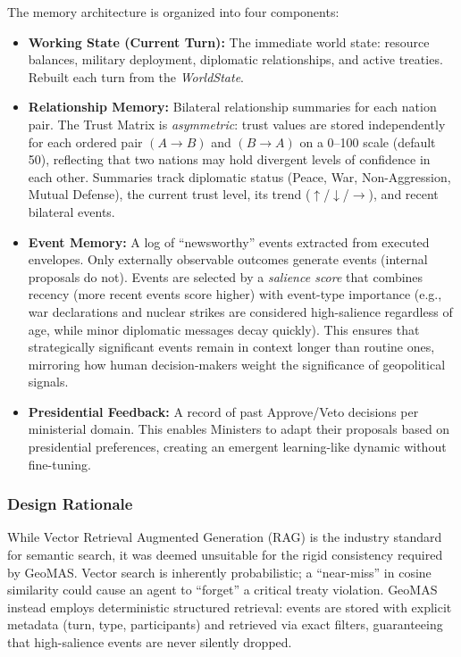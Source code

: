 The memory architecture is organized into four components:
\begin{itemize}
    \item \textbf{Working State (Current Turn):} The immediate world state: resource balances, military deployment, diplomatic relationships, and active treaties. Rebuilt each turn from the \textit{WorldState}.
    \item \textbf{Relationship Memory:} Bilateral relationship summaries for each nation pair. The Trust Matrix is \textit{asymmetric}: trust values are stored independently for each ordered pair $(A \to B)$ and $(B \to A)$ on a 0--100 scale (default 50), reflecting that two nations may hold divergent levels of confidence in each other. Summaries track diplomatic status (Peace, War, Non-Aggression, Mutual Defense), the current trust level, its trend ($\uparrow$/$\downarrow$/$\rightarrow$), and recent bilateral events.
    \item \textbf{Event Memory:} A log of ``newsworthy'' events extracted from executed envelopes. Only externally observable outcomes generate events (internal proposals do not). Events are selected by a \textit{salience score} that combines recency (more recent events score higher) with event-type importance (e.g., war declarations and nuclear strikes are considered high-salience regardless of age, while minor diplomatic messages decay quickly). This ensures that strategically significant events remain in context longer than routine ones, mirroring how human decision-makers weight the significance of geopolitical signals.
    \item \textbf{Presidential Feedback:} A record of past Approve/Veto decisions per ministerial domain. This enables Ministers to adapt their proposals based on presidential preferences, creating an emergent learning-like dynamic without fine-tuning.
\end{itemize}

\subsubsection{Design Rationale} While Vector Retrieval Augmented Generation (RAG) is the industry standard for semantic search, it was deemed unsuitable for the rigid consistency required by GeoMAS. Vector search is inherently probabilistic; a ``near-miss'' in cosine similarity could cause an agent to ``forget'' a critical treaty violation. GeoMAS instead employs deterministic structured retrieval: events are stored with explicit metadata (turn, type, participants) and retrieved via exact filters, guaranteeing that high-salience events are never silently dropped.

